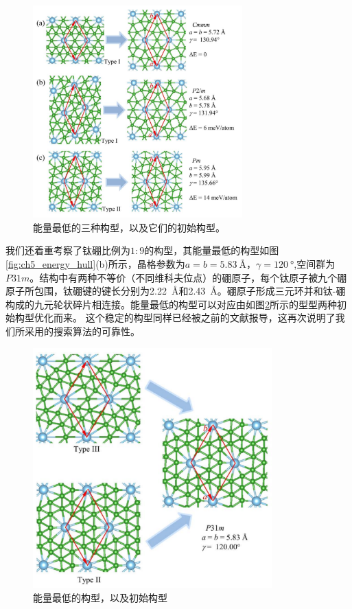 \begin{figure}
  \includegraphics[width=0.72\textwidth]{figs/ch5_tib7_last3.png}
  \centering
  \caption{能量最低的三种构型，以及它们的初始构型。}
  \label{fig:ch5_tib7_last3}
\end{figure}

我们还着重考察了钛硼比例为$1:9$的构型，其能量最低的构型如图\ref{fig:ch5_energy_hull}(b)所示，晶格参数为$a=b=\SI{5.83}{\angstrom}，\gamma=\SI{120}{\degree}$,空间群为$P31m$。结构中有两种不等价（不同维科夫位点）的硼原子，每个钛原子被九个硼原子所包围，钛硼键的键长分别为\SI{2.22}{\angstrom}和\SI{2.43}{\angstrom}。硼原子形成三元环并和钛-硼构成的九元轮状碎片相连接。能量最低的构型可以对应由如图\ref{fig:ch5_tib9}所示的型型两种初始构型优化而来。
这个稳定的构型同样已经被之前的文献\cite{wang2017semimetallic}报导，这再次说明了我们所采用的搜索算法的可靠性。

\begin{figure}
  \includegraphics[width=0.82\textwidth]{figs/ch5_tib9.png}
  \centering
  \caption{能量最低的构型，以及初始构型}
  \label{fig:ch5_tib9}
\end{figure}

